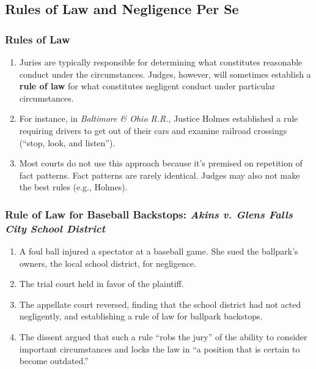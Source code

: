 \subsection{Rules of Law and Negligence Per Se}

\subsubsection{Rules of Law}

\begin{enumerate}
    \item Juries are typically responsible for determining what constitutes 
    reasonable conduct under the circumstances. Judges, however, will 
    sometimes establish a \textbf{rule of law} for what constitutes negligent 
    conduct under particular circumstances.
    \item For instance, in \emph{Baltimore \& Ohio R.R.}, Justice Holmes 
    established a rule requiring drivers to get out of their cars and examine 
    railroad crossings (``stop, look, and listen'').
    \item Most courts do not use this approach because it's premised on 
    repetition of fact patterns. Fact patterns are rarely identical. Judges 
    may also not make the best rules (e.g., Holmes).
\end{enumerate}

\subsubsection{Rule of Law for Baseball Backstops: \emph{Akins v. Glens Falls 
City School District}}

\begin{enumerate}
    \item A foul ball injured a spectator at a baseball game. She sued the 
    ballpark's owners, the local school district, for negligence.
    \item The trial court held in favor of the plaintiff.
    \item The appellate court reversed, finding that the school district had 
    not acted negligently, and establishing a rule of law for ballpark 
    backstops.
    \item The dissent argued that such a rule ``robs the jury'' of the ability 
    to consider important circumstances and locks the law in ``a position that 
    is certain to become outdated.''
\end{enumerate}

